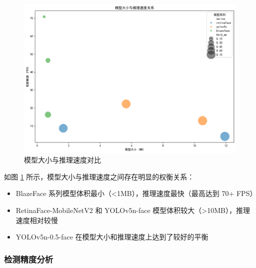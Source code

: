 \documentclass{article}
\begin{document}
\begin{figure}[htbp]
    \centering
    \includegraphics[width=0.8\linewidth]{imgs/size_fps.png}
    \caption{模型大小与推理速度对比}
    \label{fig:size_fps}
\end{figure}

如图 \ref{fig:size_fps} 所示，模型大小与推理速度之间存在明显的权衡关系：
\begin{itemize}
    \item BlazeFace 系列模型体积最小（<1MB），推理速度最快（最高达到 70+ FPS）
    \item RetinaFace-MobileNetV2 和 YOLOv5n-face 模型体积较大（>10MB），推理速度相对较慢
    \item YOLOv5n-0.5-face 在模型大小和推理速度上达到了较好的平衡
\end{itemize}

\subsubsection{检测精度分析}
\end{document}
